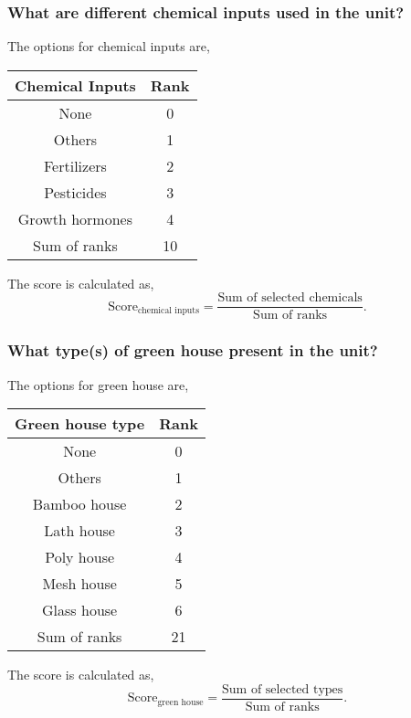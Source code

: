\documentclass[oneside,twocolumn]{article}
\newcommand{\tsub}[2]{\text{#1}_{\text{#2}}}
\newcommand{\dsub}[2]{\dfrac{\text{#1}}{\text{#2}}}
\newenvironment{ttable}
               {
                 \begin{center}
                   \begin{tabular}{c|c}
                     \hline
               }
               {
                 \\ \hline
                   \end{tabular}
                 \end{center}
               }
\begin{document}
               \subsubsection{What are different chemical inputs used in the unit?}
               The options for chemical inputs are,
               \begin{ttable}
                 Chemical Inputs & Rank \\ \hline
                 None & 0 \\
                 Others & 1 \\
                 Fertilizers & 2 \\
                 Pesticides & 3 \\
                 Growth hormones & 4 \\ \hline
                 Sum of ranks & 10
               \end{ttable}

               The score is calculated as,
               \[
               \tsub{Score}{chemical inputs} = \dfrac{\text{Sum of selected chemicals}}{\text{Sum of ranks}}.
               \]

               \subsubsection{What type(s) of green house present in the unit?}
               The options for green house are,
               \begin{ttable}
                 Green house type & Rank \\ \hline
                 None & 0 \\
                 Others & 1 \\
                 Bamboo house & 2 \\
                 Lath house & 3 \\
                 Poly house & 4 \\
                 Mesh house & 5 \\
                 Glass house & 6 \\ \hline
                 Sum of ranks & 21
               \end{ttable}

               The score is calculated as,
               \[
               \tsub{Score}{green house} = \dsub{Sum of selected types}{Sum of ranks}.
               \]
\end{document}
